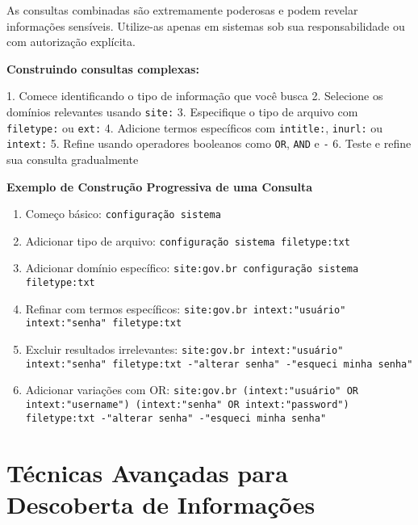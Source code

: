 \documentclass[12pt,a4paper]{book}
\begin{document}
\begin{alertbox}
As consultas combinadas são extremamente poderosas e podem revelar informações sensíveis. Utilize-as apenas em sistemas sob sua responsabilidade ou com autorização explícita.
\end{alertbox}

\begin{tipbox}
\textbf{Construindo consultas complexas:}

1. Comece identificando o tipo de informação que você busca
2. Selecione os domínios relevantes usando \texttt{site:}
3. Especifique o tipo de arquivo com \texttt{filetype:} ou \texttt{ext:}
4. Adicione termos específicos com \texttt{intitle:}, \texttt{inurl:} ou \texttt{intext:}
5. Refine usando operadores booleanos como \texttt{OR}, \texttt{AND} e \texttt{-}
6. Teste e refine sua consulta gradualmente
\end{tipbox}

\begin{mdframed}[backgroundcolor=cinzaneutro!10, roundcorner=10pt, leftmargin=1cm, rightmargin=1cm]
\begin{center}
\textbf{Exemplo de Construção Progressiva de uma Consulta}
\end{center}

\begin{enumerate}
    \item Começo básico: \texttt{configuração sistema}
    \item Adicionar tipo de arquivo: \texttt{configuração sistema filetype:txt}
    \item Adicionar domínio específico: \texttt{site:gov.br configuração sistema filetype:txt}
    \item Refinar com termos específicos: \texttt{site:gov.br intext:"usuário" intext:"senha" filetype:txt}
    \item Excluir resultados irrelevantes: \texttt{site:gov.br intext:"usuário" intext:"senha" filetype:txt -"alterar senha" -"esqueci minha senha"}
    \item Adicionar variações com OR: \texttt{site:gov.br (intext:"usuário" OR intext:"username") (intext:"senha" OR intext:"password") filetype:txt -"alterar senha" -"esqueci minha senha"}
\end{enumerate}
\end{mdframed}

\chapter{Técnicas Avançadas para Descoberta de Informações}
\end{document}
